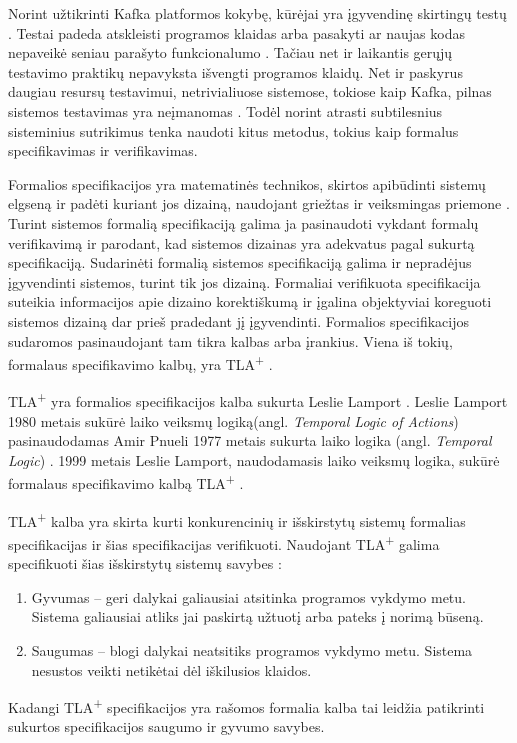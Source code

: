 \documentclass{VUMIFPSmagistrinis}
\begin{document}
		Norint užtikrinti Kafka platformos kokybę, kūrėjai yra įgyvendinę skirtingų testų \cite{kfkGH}.
		Testai padeda atskleisti programos klaidas arba pasakyti ar naujas kodas nepaveikė seniau parašyto funkcionalumo \cite{819971}.
		Tačiau net ir laikantis gerųjų testavimo praktikų nepavyksta išvengti programos klaidų.
		Net ir paskyrus daugiau resursų testavimui, netrivialiuose sistemose, tokiose kaip Kafka, pilnas sistemos testavimas yra neįmanomas \cite{sullivan2004software}.
		Todėl norint atrasti subtilesnius sisteminius sutrikimus tenka naudoti kitus metodus, tokius kaip formalus specifikavimas ir verifikavimas.


		Formalios specifikacijos yra matematinės technikos, skirtos apibūdinti sistemų elgseną ir padėti kuriant jos dizainą, naudojant griežtas ir veiksmingas priemone \cite{holzmann1995improvement}.
		Turint sistemos formalią specifikaciją galima ja pasinaudoti vykdant formalų verifikavimą ir parodant, kad sistemos dizainas yra adekvatus pagal sukurtą specifikaciją.
		Sudarinėti formalią sistemos specifikaciją galima ir nepradėjus įgyvendinti sistemos, turint tik jos dizainą. 
		Formaliai verifikuota specifikacija suteikia informacijos apie dizaino korektiškumą ir įgalina objektyviai koreguoti sistemos dizainą dar prieš pradedant jį įgyvendinti.
		Formalios specifikacijos sudaromos pasinaudojant tam tikra kalbas arba įrankius.
		Viena iš tokių, formalaus specifikavimo kalbų, yra TLA\textsuperscript{+} \cite{lamport2002specifying}.
		

		TLA\textsuperscript{+} yra formalios specifikacijos kalba sukurta Leslie Lamport \cite{lamport2002specifying}.
		Leslie Lamport 1980 metais sukūrė laiko veiksmų logiką(angl. {\it Temporal Logic of Actions}) \cite{10.1145/177492.177726} pasinaudodamas Amir Pnueli 1977 metais sukurta laiko logika (angl. {\it Temporal Logic}) \cite{4567924}.
		1999 metais Leslie Lamport, naudodamasis laiko veiksmų logika, sukūrė formalaus specifikavimo kalbą TLA\textsuperscript{+} \cite{lamport2002specifying}.
		

TLA\textsuperscript{+} kalba yra skirta kurti konkurencinių ir išskirstytų sistemų formalias specifikacijas ir šias specifikacijas verifikuoti.
		Naudojant TLA\textsuperscript{+} galima specifikuoti šias išskirstytų sistemų savybes \cite{1702415} :
		\begin{enumerate}
			\item{Gyvumas -- geri dalykai galiausiai atsitinka programos vykdymo metu. Sistema galiausiai atliks jai paskirtą užtuotį arba pateks į norimą būseną.}
			\item{Saugumas -- blogi dalykai neatsitiks programos vykdymo metu. Sistema nesustos veikti netikėtai dėl iškilusios klaidos.}
		\end{enumerate}
		Kadangi TLA\textsuperscript{+} specifikacijos yra rašomos formalia kalba tai leidžia patikrinti sukurtos specifikacijos saugumo ir gyvumo savybes.
		
\end{document}
